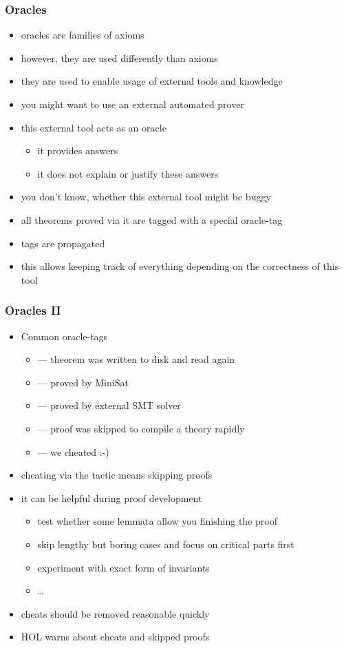 \begin{frame}
\frametitle{Oracles}
\begin{itemize}
\item \alert{oracles} are families of axioms
\item however, they are used differently than axioms
\item they are used to enable usage of external tools and knowledge
\item you might want to use an external automated prover
\item this external tool acts as an oracle
\begin{itemize}
\item it provides answers
\item it does not explain or justify these answers
\end{itemize}
\item you don't know, whether this external tool might be buggy
\item all theorems proved via it are tagged with a special oracle-tag
\item tags are propagated
\item this allows keeping track of everything depending on the correctness of this tool
\end{itemize}
\end{frame}

\begin{frame}
\frametitle{Oracles II}
\begin{itemize}
\item Common oracle-tags
\begin{itemize}
\item {} --- theorem was written to disk and read again
\item {} --- proved by MiniSat
\item {} --- proved by external SMT solver
\item {} --- proof was skipped to compile a theory rapidly
\item {} --- we cheated :-)
\end{itemize}
\item \alert{cheating} via \eg the  tactic means skipping proofs 
\item it can be helpful during proof development
\begin{itemize}
\item test whether some lemmata allow you finishing the proof
\item skip lengthy but boring cases and focus on critical parts first
\item experiment with exact form of invariants
\item \ldots
\end{itemize}
\item cheats should be removed reasonable quickly
\item HOL warns about cheats and skipped proofs
\end{itemize}
\end{frame}


